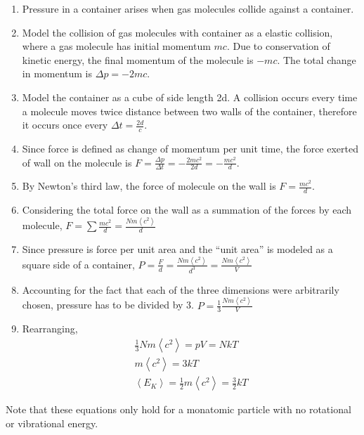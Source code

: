 \documentclass[../main]{subfiles}
\begin{document}
	\begin{enumerate}
		\item Pressure in a container arises when gas molecules collide against a container.
		\item Model the collision of gas molecules with container as a elastic collision, where a gas molecule has initial momentum \(mc\). Due to conservation of kinetic energy, the final momentum of the molecule is \(-mc\). The total change in momentum is \(\Delta p = -2mc\).
		\item Model the container as a cube of side length 2d. A collision occurs every time a molecule moves twice distance between two walls of the container, therefore it occurs once every \(\Delta t = \frac{2d}{c}\).
		\item Since force is defined as change of momentum per unit time, the force exerted of wall on the molecule is \(F = \frac{\Delta p}{\Delta t} = -\frac{2mc^2}{2d} = -\frac{mc^2}{d}\).
		\item By Newton's third law, the force of molecule on the wall is \(F = \frac{mc^2}{d}\).
		\item Considering the total force on the wall as a summation of the forces by each molecule, \(F = \sum \frac{mc^2}{d} = \frac{Nm\left<c^2\right>}{d}\)
		\item Since pressure is force per unit area and the ``unit area'' is modeled as a square side of a container, \(P = \frac{F}{d} = \frac{Nm\left<c^2\right>}{d^3} = \frac{Nm\left<c^2\right>}{V}\)
		\item Accounting for the fact that each of the three dimensions were arbitrarily chosen, pressure has to be divided by 3. \(P = \frac{1}{3}\frac{Nm\left<c^2\right>}{V}\)
		\item Rearranging,
		\begin{equation*} \begin{gathered}
			\frac{1}{3} Nm\left<c^2\right> = pV = NkT \\
			m\left<c^2\right> = 3kT \\
			\left<E_K\right> = \frac{1}{2} m\left<c^2\right> = \frac{3}{2} kT
		\end{gathered} \end{equation*}
	\end{enumerate}



	Note that these equations only hold for a monatomic particle with no rotational or vibrational energy.
\end{document}
